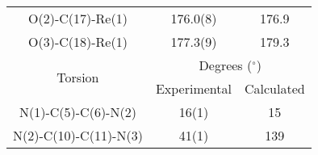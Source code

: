 \begin{table}[htbp]
\begin{tabular}{ccc}
    O(2)-C(17)-Re(1) & 176.0(8) & 176.9 \\ 
    O(3)-C(18)-Re(1) & 177.3(9) & 179.3 \\ \midrule
    \multirow{2}{*}{Torsion} & \multicolumn{2}{c}{Degrees ($^\circ$)} \\ \cline{2-3}
     & Experimental & Calculated \\ \midrule
    N(1)-C(5)-C(6)-N(2) &  16(1) & 15\\
    N(2)-C(10)-C(11)-N(3) & 41(1) & 139\\
    \bottomrule
    \end{tabular}%
  \label{tab.da1}%
\end{table}%


